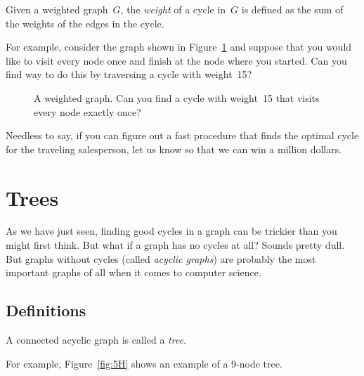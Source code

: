 \begin{definition}
Given a weighted graph~$G$, the \emph{weight} of a cycle in~$G$ is
defined as the sum of the weights of the edges in the cycle.
\end{definition}

For example, consider the graph shown in Figure~\ref{fig:5AL} and
suppose that you would like to visit every node once and finish at the
node where you started.  Can you find  way to do this by traversing a
cycle with weight~15?

\begin{figure}


\caption{A weighted graph.  Can you find a cycle with weight~15 that
  visits every node exactly once?}

\label{fig:5AL}
\end{figure}

Needless to say, if you can figure out a fast procedure that finds the
optimal cycle for the traveling salesperson, let us know so that we
can win a million dollars.

\begin{problems}
\examproblems
{}

\homeworkproblems
{}
\end{problems}

\section{Trees}\label{trees-sec}

As we have just seen, finding good cycles in a graph can be trickier
than you might first think.  But what if a graph has no cycles at all?
Sounds pretty dull.  But graphs without cycles (called \emph{acyclic
  graphs}) are probably the most important graphs of all when it comes
to computer science.

\subsection{Definitions}

\begin{definition}\label{def:tree}
A connected acyclic graph is called a \emph{tree}.
\end{definition}

For example, Figure~\ref{fig:5H} shows an example of a 9-node tree.


